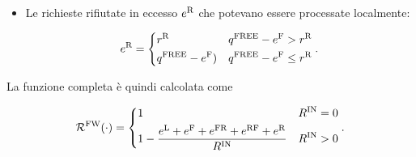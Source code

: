 \begin{itemize}
    \item Le richieste rifiutate in eccesso $e^\textnormal{R}$ che potevano essere processate localmente:

    \begin{equation}
        e^\textnormal{R} = \begin{dcases}
            r^\textnormal{R} & q^\textnormal{FREE} - e^\textnormal{F} > r^\textnormal{R} \\
            q^\textnormal{FREE} - e^\textnormal{F}) & q^\textnormal{FREE} - e^\textnormal{F} \le r^\textnormal{R}
        \end{dcases}.
    \end{equation}
\end{itemize}

La funzione completa è quindi calcolata come

\begin{equation}
    \mathcal{R}^\textnormal{FW}(\cdot) = \begin{dcases}
        1 & R^\textnormal{IN} = 0 \\
        1 - \frac{e^\textnormal{L} + e^\textnormal{F} + e^\textnormal{FR} + e^\textnormal{RF} + e^\textnormal{R}}{R^\textnormal{IN}} & R^\textnormal{IN} > 0
    \end{dcases}.
\end{equation}

